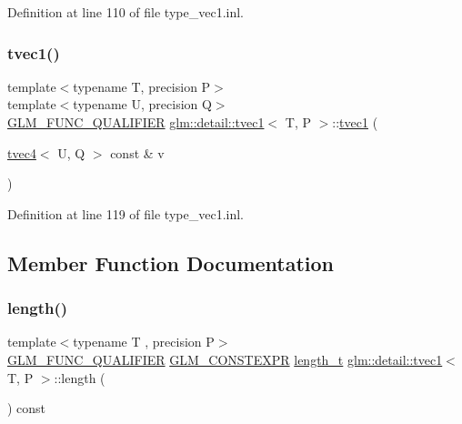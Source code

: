 Definition at line 110 of file type\+\_\+vec1.\+inl.

\mbox{\label{structglm_1_1detail_1_1tvec1_afc81da6a984943c6e773834ab7fc75f0}} 
\subsubsection{\texorpdfstring{tvec1()}{tvec1()}\hspace{0.1cm}{\footnotesize\ttfamily [14/14]}}
{\footnotesize\ttfamily template$<$typename T, precision P$>$ \\
template$<$typename U, precision Q$>$ \\
\hyperlink{setup_8hpp_a33fdea6f91c5f834105f7415e2a64407}{G\+L\+M\+\_\+\+F\+U\+N\+C\+\_\+\+Q\+U\+A\+L\+I\+F\+I\+ER} \hyperlink{structglm_1_1detail_1_1tvec1}{glm\+::detail\+::tvec1}$<$ T, P $>$\+::\hyperlink{structglm_1_1detail_1_1tvec1}{tvec1} (\begin{DoxyParamCaption}\item[{\hyperlink{structglm_1_1detail_1_1tvec4}{tvec4}$<$ U, Q $>$ const \&}]{v }\end{DoxyParamCaption})}



Definition at line 119 of file type\+\_\+vec1.\+inl.



\subsection{Member Function Documentation}
\mbox{\label{structglm_1_1detail_1_1tvec1_a82fff0257ca2da5997924ce1146e34cb}} 
\subsubsection{\texorpdfstring{length()}{length()}}
{\footnotesize\ttfamily template$<$typename T , precision P$>$ \\
\hyperlink{setup_8hpp_a33fdea6f91c5f834105f7415e2a64407}{G\+L\+M\+\_\+\+F\+U\+N\+C\+\_\+\+Q\+U\+A\+L\+I\+F\+I\+ER} \hyperlink{setup_8hpp_a08b807947b47031d3a511f03f89645ad}{G\+L\+M\+\_\+\+C\+O\+N\+S\+T\+E\+X\+PR} \hyperlink{namespaceglm_a090a0de2260835bee80e71a702492ed9}{length\+\_\+t} \hyperlink{structglm_1_1detail_1_1tvec1}{glm\+::detail\+::tvec1}$<$ T, P $>$\+::length (\begin{DoxyParamCaption}{ }\end{DoxyParamCaption}) const}



